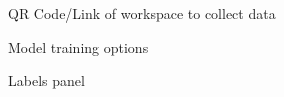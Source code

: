\begin{figure}[ht]
    \centering
    \caption{QR Code/Link of workspace to collect data}
    \label{fig:workspace-link}
\end{figure}

\begin{figure}[ht]
    \centering
    \caption{Model training options}
    \label{fig:training-options}
\end{figure}

\begin{figure}[ht]
    \centering
    \caption{Labels panel}
    \label{fig:labels-panel}
\end{figure}


